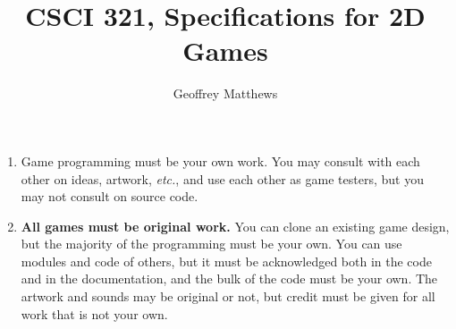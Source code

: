 \documentclass{article}
\begin{document}
\title{CSCI 321, Specifications for 2D Games}
\author{Geoffrey Matthews}

\maketitle

\begin{enumerate}

\item Game programming must be your own work.  You may consult with
  each other on ideas, artwork, {\em etc.}, and use each other as game
  testers, but you may not consult on source code.

\item {\bf All games must be original work.} You can clone an existing
  game design, but the majority of the programming must be your own.
  You can use modules and code of others, but it must be acknowledged
  both in the code and in the documentation, and the bulk of the code
  must be your own. The artwork and sounds may be original or not, but
  credit must be given for all work that is not your own.


\end{enumerate}
\end{document}
